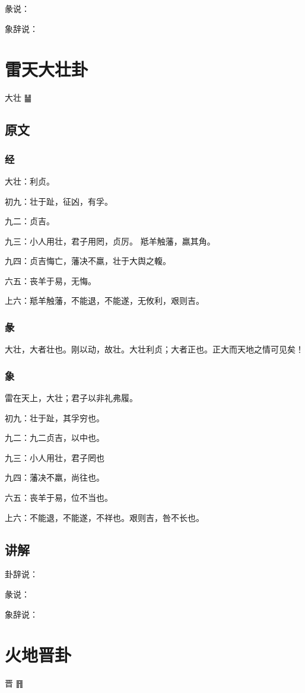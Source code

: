\documentclass[12pt,oneside]{book}
\begin{document}
彖说：

象辞说：


\chapter{雷天大壮卦}
大壮 {\Large ䷡}

\section{原文}

\subsection{经}
大壮：利贞。

初九：壮于趾，征凶，有孚。

九二：贞吉。

九三：小人用壮，君子用罔，贞厉。 羝羊触藩，羸其角。

九四：贞吉悔亡，藩决不羸，壮于大舆之輹。

六五：丧羊于易，无悔。

上六：羝羊触藩，不能退，不能遂，无攸利，艰则吉。

\subsection{彖}
大壮，大者壮也。刚以动，故壮。大壮利贞；大者正也。正大而天地之情可见矣！

\subsection{象}
雷在天上，大壮；君子以非礼弗履。

初九：壮于趾，其孚穷也。

九二：九二贞吉，以中也。

九三：小人用壮，君子罔也

九四：藩决不羸，尚往也。

六五：丧羊于易，位不当也。

上六：不能退，不能遂，不祥也。艰则吉，咎不长也。

\section{讲解}
卦辞说：

彖说：

象辞说：

\chapter{火地晋卦}
晋 {\Large ䷢}
\end{document}

